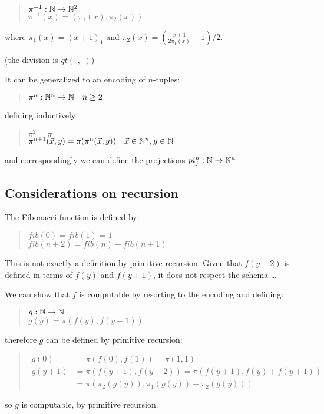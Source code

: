 \begin{quote}
  $\pi^{-1}:\mathbb{N}\rightarrow\mathbb{N}^2$\\
  $\pi^{-1}(x) = (\pi_1(x),\pi_2(x))$
\end{quote}
%
where $\pi_1(x) = (x+1)_1$ and 
$\pi_2(x) = (\frac{x+1}{2\pi_1(x)}-1)/2$.

(the division is $qt(\_,\_)$)

It can be generalized to an encoding of $n$-tuples:
\begin{quote}
  $\pi^n: \mathbb{N}^n\rightarrow\mathbb{N} \quad n\geq2$
\end{quote}
defining inductively
\begin{quote}
  $\pi^2 = \pi$\\
  $\pi^{n+1}(\vec{x},y) = \pi(\pi^n(\vec{x},y)) \quad \vec{x} \in \mathbb{N}^n, y \in \mathbb{N}$
\end{quote}

and correspondingly we can define the projections $pi_j^n:\mathbb{N}\rightarrow\mathbb{N}^n$

\subsection{Considerations on recursion}

The Fibonacci function is defined by:

\begin{quote}
  $ fib(0) = fib(1) = 1$\\
  $fib(n+2) = fib(n) + fib(n+1)$
\end{quote}

This is not exactly a definition by primitive recursion. Given that $f(y+2)$ is defined in terms of $f(y)$ and $f(y+1)$, it does not respect the schema \dots

We can show that $f$ is computable by resorting to the encoding and defining:

\begin{quote}
  $g:\mathbb{N}\rightarrow\mathbb{N}$\\
  $g(y) = \pi(f(y),f(y+1))$\\
\end{quote}

therefore $g$ can be defined by primitive recursion:

\begin{quote}
  $\begin{array}{ll}
     g(0) & =  \pi(f(0),f(1)) = \pi(1,1)\\[2mm]
     g(y+1)  & = \pi(f(y+1),f(y+2)) = \pi(f(y+1),f(y)+f(y+1))\\
              & = \pi(\pi_2(g(y)), \pi_1(g(y)) + \pi_2(g(y)))
   \end{array}
   $
\end{quote}
so $g$ is computable, by primitive recursion.

